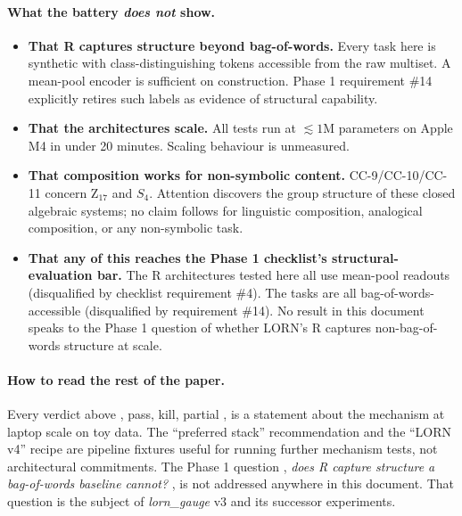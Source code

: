 \documentclass[10pt, twocolumn, a4paper]{article}
\begin{document}
\paragraph{What the battery \emph{does not} show.}
\begin{itemize}[nosep,leftmargin=*]
\item \textbf{That R captures structure beyond bag-of-words.} Every task here is synthetic with class-distinguishing tokens accessible from the raw multiset. A mean-pool encoder is sufficient on construction. Phase 1 requirement \#14 explicitly retires such labels as evidence of structural capability.
\item \textbf{That the architectures scale.} All tests run at $\lesssim 1$M parameters on Apple M4 in under 20 minutes. Scaling behaviour is unmeasured.
\item \textbf{That composition works for non-symbolic content.} CC-9/CC-10/CC-11 concern Z$_{17}$ and $S_4$. Attention discovers the group structure of these closed algebraic systems; no claim follows for linguistic composition, analogical composition, or any non-symbolic task.
\item \textbf{That any of this reaches the Phase 1 checklist's structural-evaluation bar.} The R architectures tested here all use mean-pool readouts (disqualified by checklist requirement \#4). The tasks are all bag-of-words-accessible (disqualified by requirement \#14). No result in this document speaks to the Phase 1 question of whether LORN's R captures non-bag-of-words structure at scale.
\end{itemize}

\paragraph{How to read the rest of the paper.}
Every verdict above ,  pass, kill, partial ,  is a statement about the mechanism at laptop scale on toy data. The ``preferred stack'' recommendation and the ``LORN v4'' recipe are pipeline fixtures useful for running further mechanism tests, not architectural commitments. The Phase 1 question ,  \emph{does R capture structure a bag-of-words baseline cannot?} ,  is not addressed anywhere in this document. That question is the subject of \emph{lorn\_gauge} v3 and its successor experiments.
\end{document}
